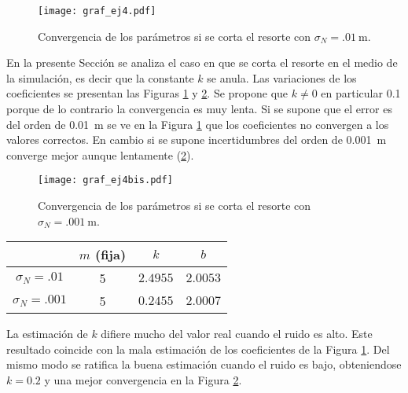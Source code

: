 

	\begin{figure}[h!]
		\centering
		\texttt{[image: graf\_ej4.pdf]}
		\caption{Convergencia de los parámetros si se corta el resorte con $\sigma_N = \SI{.01}{\m}$.}
		\label{fig:ej4}
	\end{figure}

	En la presente Sección se analiza el caso en que se corta el resorte en el medio de la simulación, es decir que la constante $k$ se anula. Las variaciones de los coeficientes se presentan las Figuras \ref{fig:ej4} y \ref{fig:ej4bis}. 
	Se propone que $k\neq0$ en particular \num{.1} porque de lo contrario la convergencia es muy lenta. Si se supone que el error es del orden de \SI{.01}{\m} se ve en la Figura \ref{fig:ej4} que los coeficientes no convergen a los valores correctos. En cambio si se supone incertidumbres del orden de \SI{0.001}{\m} converge mejor aunque lentamente (\ref{fig:ej4bis}). 

	\begin{figure}[h!]
		\centering
		\texttt{[image: graf\_ej4bis.pdf]}
		\caption{Convergencia de los parámetros si se corta el resorte con $\sigma_N = \SI{.001}{\m}$.}
		\label{fig:ej4bis}
	\end{figure}


	
		\begin{table}[h!]
			\centering
			\begin{tabular}{cccc}
				\toprule
				&$m$ (fija)	& $k$	& $b$\\
				\midrule
				$\sigma_N=\num{.01}$&5&$\num{2.4955}$&$\num{2.0053}$\\
				$\sigma_N=\num{.001}$&5&$\num{0.2455}$&$\num{2.0007}$\\
				\bottomrule
			\end{tabular}
		\end{table}

		La estimación de $k$ difiere mucho del valor real cuando el ruido es alto. Este resultado coincide con la mala estimación de los coeficientes de la Figura \ref{fig:ej4}. Del mismo modo se ratifica la buena estimación cuando el ruido es bajo, obteniendose $k=\num{0.2}$ y una mejor convergencia en la Figura \ref{fig:ej4bis}.
